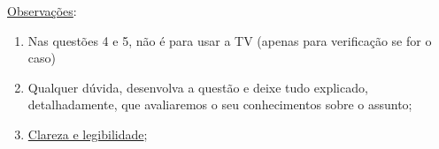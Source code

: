 \documentclass[12pt]{article}
\begin{document}
\begin{enumerate}
{\begin{flushleft}
\underline{Observações}:
\begin{enumerate}
\setlength{\itemsep}{-2pt}

\item Nas questões 4 e 5, não é para usar a TV (apenas para verificação se for o caso)

\item Qualquer dúvida, desenvolva a questão e deixe tudo
explicado, detalhadamente, que avaliaremos o seu conhecimentos sobre
 o assunto;

 \item \underline{Clareza e legibilidade};

\end{enumerate}
\end{flushleft}
}




\end{enumerate}
\newpage
\end{document}

